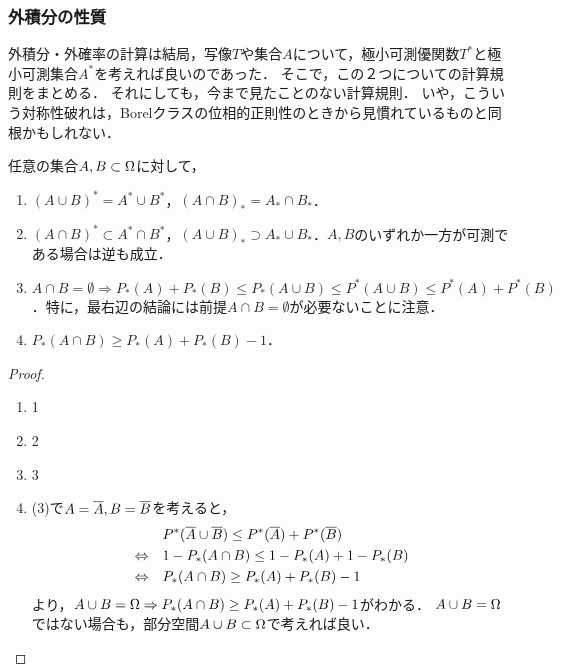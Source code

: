 \documentclass[uplatex,dvipdfmx]{jsreport}
\begin{document}
\subsubsection{外積分の性質}

\begin{tcolorbox}[colframe=ForestGreen, colback=ForestGreen!10!white,breakable,colbacktitle=ForestGreen!40!white,coltitle=black,fonttitle=\bfseries\sffamily,
title=]
    外積分・外確率の計算は結局，写像$T$や集合$A$について，極小可測優関数$T^*$と極小可測集合$A^*$を考えれば良いのであった．
    そこで，この２つについての計算規則をまとめる．
    それにしても，今まで見たことのない計算規則．
    いや，こういう対称性破れは，Borelクラスの位相的正則性のときから見慣れているものと同根かもしれない．
\end{tcolorbox}

\begin{lemma}\label{lemma-character-of-minimal-measurable-set}
    任意の集合$A,B\subset\Omega$に対して，
    \begin{enumerate}
        \item $(A\cup B)^*=A^*\cup B^*$，$(A\cap B)_*=A_*\cap B_*$．
        \item $(A\cap B)^*\subset A^*\cap B^*$，$(A\cup B)_*\supset A_*\cup B_*$．$A,B$のいずれか一方が可測である場合は逆も成立．
        \item $A\cap B=\emptyset\Rightarrow P_*(A)+P_*(B)\le P_*(A\cup B)\le P^*(A\cup B)\le P^*(A)+P^*(B)$．特に，最右辺の結論には前提$A\cap B=\emptyset$が必要ないことに注意．
        \item $P_*(A\cap B)\ge P_*(A)+P_*(B)-1$．
    \end{enumerate}
\end{lemma}
\begin{proof}\mbox{}
    \begin{enumerate}
        \item 1
        \item 2
        \item 3
        \item (3)で$A=\overline{A},B=\overline{B}$を考えると，
        \begin{align*}
            &P^*(\overline{A}\cup\overline{B})\le P^*(\overline{A})+P^*(\overline{B})\\
            \Leftrightarrow\quad&1-P_*(A\cap B)\le 1-P_*(A)+1-P_*(B)\\
            \Leftrightarrow\quad&P_*(A\cap B)\ge P_*(A)+P_*(B)-1
        \end{align*}
        より，$A\cup B=\Omega\Rightarrow P_*(A\cap B)\ge P_*(A)+P_*(B)-1$がわかる．
        $A\cup B=\Omega$ではない場合も，部分空間$A\cup B\subset\Omega$で考えれば良い．
    \end{enumerate}
\end{proof}
\end{document}
